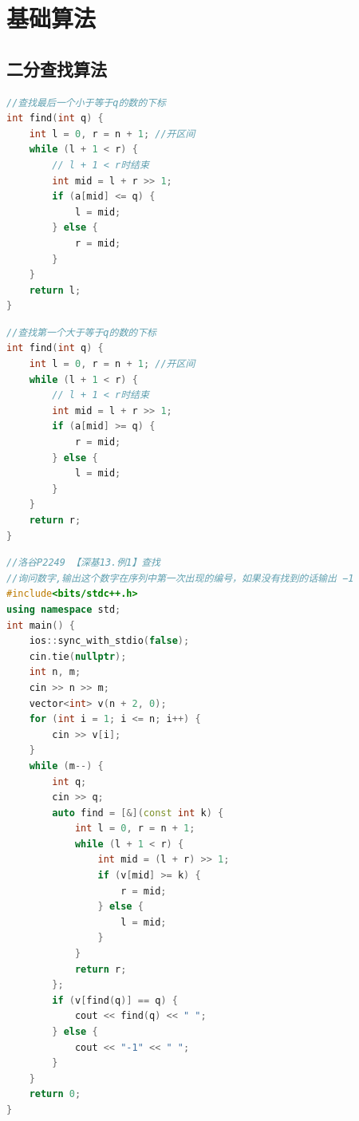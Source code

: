 \section{基础算法}






\subsection{二分查找算法}

\begin{lstlisting}[language=c++,caption={查找最后一个小于等于q的数的下标}]
//查找最后一个小于等于q的数的下标
int find(int q) {
	int l = 0, r = n + 1; //开区间
	while (l + 1 < r) {
		// l + 1 < r时结束
		int mid = l + r >> 1;
		if (a[mid] <= q) {
			l = mid;
		} else {
			r = mid;
		}
	}
	return l;
}
\end{lstlisting}

\begin{lstlisting}[language=c++,caption={查找第一个大于等于q的数的下标}]
//查找第一个大于等于q的数的下标
int find(int q) {
	int l = 0, r = n + 1; //开区间
	while (l + 1 < r) {
		// l + 1 < r时结束
		int mid = l + r >> 1;
		if (a[mid] >= q) {
			r = mid;
		} else {
			l = mid;
		}
	}
	return r;
}

\end{lstlisting}

\begin{lstlisting}[language=c++,caption={洛谷P2249 查找}]
//洛谷P2249 【深基13.例1】查找
//询问数字,输出这个数字在序列中第一次出现的编号，如果没有找到的话输出 −1 
#include<bits/stdc++.h>
using namespace std;
int main() {
	ios::sync_with_stdio(false);
	cin.tie(nullptr);
	int n, m;
	cin >> n >> m;
	vector<int> v(n + 2, 0);
	for (int i = 1; i <= n; i++) {
		cin >> v[i];
	}
	while (m--) {
		int q;
		cin >> q;
		auto find = [&](const int k) {
			int l = 0, r = n + 1;
			while (l + 1 < r) {
				int mid = (l + r) >> 1;
				if (v[mid] >= k) {
					r = mid;
				} else {
					l = mid;
				}
			}
			return r;
		};
		if (v[find(q)] == q) {
			cout << find(q) << " ";
		} else {
			cout << "-1" << " ";
		}
	}
	return 0;
}

\end{lstlisting}


